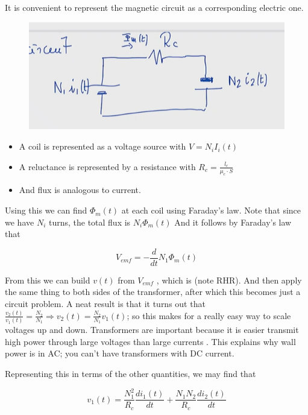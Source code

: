 \documentclass[10pt]{article}
\begin{document}
It is convenient to represent the magnetic circuit as a corresponding electric one.

\begin{figure}[H]
	\centering
	\includegraphics[width=0.8\linewidth]{img/image_2022-04-18-17-09-01.png}
\end{figure}

\begin{itemize}
	\item A coil is represented as a voltage source with $ V = N_i I_i(t) $ 
	\item A reluctance is represented by a resistance with $ R_c = \frac{l_c}{\mu_c \cdot S} $ 
	\item And flux is analogous to current.
\end{itemize}


Using this we can find $ \Phi_m(t) $ at each coil using Faraday's law.
Note that since we have $ N_i $ turns, the total flux is $ N_i \Phi_m(t) $
And it follows by Faraday's law that

\begin{equation}
	V_{emf} = -\frac{d}{dt} N_1 \Phi_m(t)
\end{equation}


From this we can build $ v(t) $  from $ V_{emf} $ , which is (note RHR).
And then apply the same thing to both sides of the transformer, after which this becomes just a circuit problem.
A neat result is that it turns out that $ \frac{v_2(t)}{v_1(t)} = \frac{N_2}{N_1} \Rightarrow v_2(t) = \frac{N_2}{N_1} v_1(t)$; so this makes for a really easy way to scale voltages up and down. 
Transformers are important because it is easier transmit high power through large voltages than large currents .
This explains why wall power is in AC; you can't have transformers with DC current.

Representing this in terms of the other quantities, we may find that

\begin{equation}
	v_1(t) = \frac{N_1^2}{R_c} \frac{di_1(t)}{dt} + \frac{N_1N_2}{R_c} \frac{di_2(t)}{dt}
\end{equation}
\end{document}
